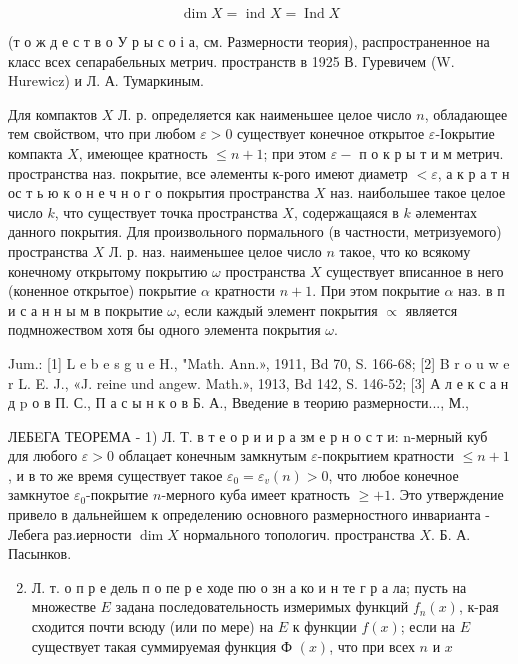 \documentclass[10pt]{article}
\begin{document}
\[

\operatorname{dim} X=\text { ind } X=\operatorname{Ind} X

\]



(т о ж д е с т в о У р ы с о і а, см. Размерности теория), распространенное на класс всех сепарабельных метрич. пространств в 1925 В. Гуревичем (W. Hurewicz) и Л. А. Тумаркиным.



Для компактов $X$ Л. р. определяется как наименьшее целое число $n$, обладающее тем свойством, что при любом $\varepsilon>0$ существует конечное открытое $\varepsilon$-Іокрытие компакта $X$, имеющее кратность $\leqslant n+1$; при этом $\varepsilon-$ п о к р ы т и м метрич. пространства наз. покрытие, все әлементы к-рого имеют диаметр $<\varepsilon$, а к р а т н ос т ь ю к о н е ч н о г о покрытия пространства $X$ наз. наибольшее такое целое число $k$, что существует точка пространства $X$, содержащаяся в $k$ әлементах данного покрытия. Для произвольного пормального (в частности, метризуемого) пространства $X$ Л. р. наз. наименьшее целое число $n$ такое, что ко всякому конечному открытому покрытию $\omega$ пространства $X$ существует вписанное в него (коненное открытое) покрытие $\alpha$ кратности $n+1$. При этом покрытие $\alpha$ наз. в п и с а н н ы м в покрытие $\omega$, если каждый элемент покрытия $\propto$ является подмножеством хотя бы одного элемента покрытия $\omega$.



Jum.: [1] L e b e s g u e H., "Math. Ann.», 1911, Bd 70, S. 166-68; [2] B r o u w e r L. E. J., «J. reine und angew. Math.», 1913, Bd 142, S. 146-52; [3] А л е к с а н д p о в П. С., П а с ы н к о в Б. А., Введение в теорию размерности..., М.,



ЛЕБEГА ТЕОРЕМА - 1) Л. Т. в т е о р и и р а зм е р н о с т и: n-мерный куб для любого $\varepsilon>0$ облацает конечным замкнутым $\varepsilon$-покрытием кратности $\leqslant n+1$, и в то же время существует такое $\varepsilon_{0}=\varepsilon_{v}(n)>0$, что любое конечное замкнутое $\varepsilon_{0}$-покрытие $n$-мерного куба имеет кратность $\geqslant+1$. Это утверждение привело в дальнейшем к определению основного размерностного инварианта - Лебега раз.иерности $\operatorname{dim} X$ нормального топологич. пространства $X$. Б. А. Пасынков.



\begin{enumerate}

  \setcounter{enumi}{1}

  \item Л. т. о п р е дель п о пе р е ходе пю о зн а ко и н те г р а ла; пусть на множестве $E$ задана последовательность измеримых функций $f_{n}(x)$, к-рая сходится почти всюду (или по мере) на $E$ к функции $f(x)$; если на $E$ существует такая суммируемая функция Ф $(x)$, что при всех $n$ и $x$

\end{enumerate}
\end{document}
